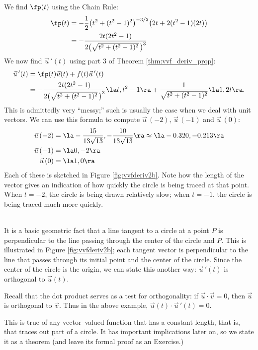{\begin{enumerate}
We find $\fp(t)$ using the Chain Rule:
\begin{align*}
\fp(t) &= -\frac12\big(t^2+(t^2-1)^2\big)^{-3/2}\big(2t+2(t^2-1)(2t)\big)\\
			&= -\frac{2t(2t^2-1)}{2\big(\sqrt{t^2+(t^2-1)^2}\,\big)^3}
\end{align*}
We now find $\vec u\,'(t)$ using part 3 of Theorem \ref{thm:vvf_deriv_prop}:
\begin{align*}
\vec u\,'(t) &=  \fp(t)\vec u(t) + f(t)\vec u\,'(t) \\
				&=  -\frac{2t(2t^2-1)}{2\big(\sqrt{t^2+(t^2-1)^2}\,\big)^3}\la t,t^2-1\ra + \frac{1}{\sqrt{t^2+(t^2-1)^2}}\la 1,2t\ra.
\end{align*}
This is admittedly very ``messy;'' such is usually the case when we deal with unit vectors. We can use this formula to compute $\vec u\,(-2)$, $\vec u\,(-1)$ and $\vec u\,(0)$:
\begin{align*}
\vec u\,(-2) &= \la-\frac{15}{13 \sqrt{13}},-\frac{10}{13
   \sqrt{13}}\ra \approx \la -0.320,-0.213\ra\\
\vec u\,(-1) &= \la 0,-2\ra\\
\vec u\,(0) &= \la 1,0\ra
\end{align*}
Each of these is sketched in Figure \ref{fig:vvfderiv2b}. Note how the length of the vector gives an indication of how quickly the circle is being traced at that point. When $t=-2$, the circle is being drawn relatively slow; when $t=-1$, the circle is being traced much more quickly.
\end{enumerate}
\baselineskip
}\\

It is a basic geometric fact that a line tangent to a circle at a point $P$ is perpendicular to the line passing through the center of the circle and $P$. This is illustrated in Figure \ref{fig:vvfderiv2b}; each tangent vector is perpendicular to the line that passes through its initial point and the center of the circle. Since the center of the circle is the origin, we can state this another way: $\vec u\,'(t)$ is orthogonal to $\vec u(t)$.

Recall that the dot product serves as a test for orthogonality: if $\vec u\cdot \vec v = 0$, then $\vec u$ is orthogonal to $\vec v$. Thus in the above example, $\vec u(t)\cdot \vec u\,'(t)=0$.

This is true of any vector--valued function that has a constant length, that is, that traces out part of a circle. It has important implications later on, so we state it as a theorem (and leave its formal proof as an Exercise.)

